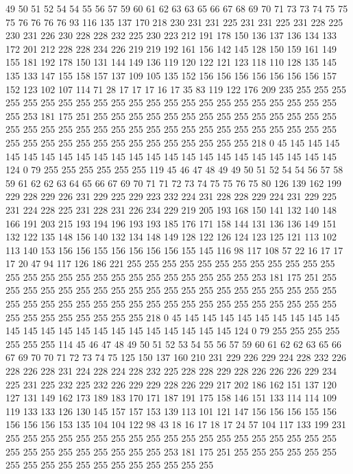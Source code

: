 49 50 51 52 54 54 55 56 57 59 60 61 62 63 63 65 66 67 68 69
70 71 73 73 74 75 75 75 76 76 76 76 93 116 135 137 170 218 230 231
231 225 231 231 225 231 228 225 230 231 226 230 228 228 232 225 230 223 212 191
178 150 136 137 136 134 133 172 201 212 228 228 234 226 219 219 192 161 156 142
145 128 150 159 161 149 155 181 192 178 150 131 144 149 136 119 120 122 121 123
118 110 128 135 145 135 133 147 155 158 157 137 109 105 135 152 156 156 156 156
156 156 156 157 152 123 102 107 114 71 28 17 17 17 16 17 35 83 119 122
176 209 235 255 255 255 255 255 255 255 255 255 255 255 255 255 255 255 255 255
255 255 255 255 255 255 253 181 175 251 255 255 255 255 255 255 255 255 255 255
255 255 255 255 255 255 255 255 255 255 255 255 255 255 255 255 255 255 255 255
255 255 255 255 255 255 255 255 255 255 255 255 255 255 255 255 255 218 0 45
145 145 145 145 145 145 145 145 145 145 145 145 145 145 145 145 145 145 145 145
145 145 124 0 79 255 255 255 255 255 255 119 45 46 47 48 49 49 50 51
52 54 54 56 57 58 59 61 62 62 63 64 65 66 67 69 70 71 71 72
73 74 75 75 76 75 80 126 139 162 199 229 228 229 226 231 229 225 229 223
232 224 231 228 228 229 224 231 229 225 231 224 228 225 231 228 231 226 234 229
219 205 193 168 150 141 132 140 148 166 191 203 215 193 194 196 193 193 185 176
171 158 144 131 136 136 149 151 132 122 135 148 156 140 132 134 148 149 128 122
126 124 123 125 121 113 102 113 140 153 156 156 155 156 156 156 156 155 145 116
98 117 108 57 22 16 17 17 17 20 47 94 117 126 186 221 255 255 255 255
255 255 255 255 255 255 255 255 255 255 255 255 255 255 255 255 255 255 255 255
255 255 253 181 175 251 255 255 255 255 255 255 255 255 255 255 255 255 255 255
255 255 255 255 255 255 255 255 255 255 255 255 255 255 255 255 255 255 255 255
255 255 255 255 255 255 255 255 255 255 255 255 255 218 0 45 145 145 145 145
145 145 145 145 145 145 145 145 145 145 145 145 145 145 145 145 145 145 124 0
79 255 255 255 255 255 255 255 114 45 46 47 48 49 50 51 52 53 54 55
56 57 59 60 61 62 62 63 65 66 67 69 70 70 71 72 73 74 75 125
150 137 160 210 231 229 226 229 224 228 232 226 228 226 228 231 224 228 224 228
232 225 228 228 229 228 226 226 226 229 234 225 231 225 232 225 232 226 229 229
228 226 229 217 202 186 162 151 137 120 127 131 149 162 173 189 183 170 171 187
191 175 158 146 151 133 114 114 109 119 133 133 126 130 145 157 157 153 139 113
101 121 147 156 156 156 155 156 156 156 156 153 135 104 104 122 98 43 18 16
17 18 17 24 57 104 117 133 199 231 255 255 255 255 255 255 255 255 255 255
255 255 255 255 255 255 255 255 255 255 255 255 255 255 255 255 255 255 253 181
175 251 255 255 255 255 255 255 255 255 255 255 255 255 255 255 255 255 255 255
